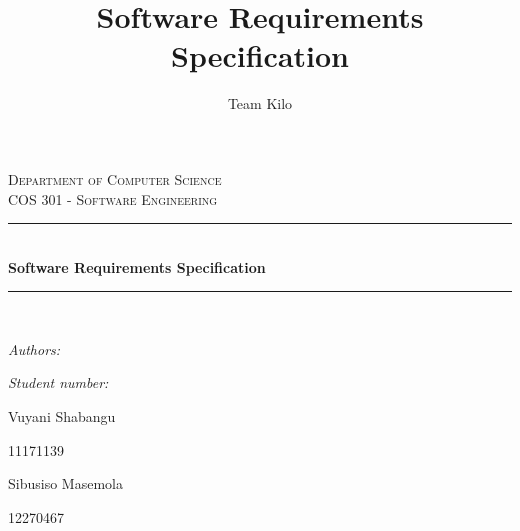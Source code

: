 \documentclass[hidelinks,a4paper,12pt]{article}
\author{Team Kilo}
\title{ Software Requirements Specification}
\newcommand{\HRule}{\rule{\linewidth}{0.5mm}}
\begin{document}
	\setlength{\parskip}{6pt}
	
	\begin{titlepage}
		
		\begin{center}
		
			\textsc{\LARGE Department of Computer Science}\\[1.5cm]
			\textsc{\Large COS 301 - Software Engineering}\\[0.5cm]
			\HRule \\[0.4cm]
			{ \huge \bfseries Software Requirements Specification}\\[0.4cm]
			\HRule \\[0.4cm]
			\begin{minipage}{0.4\textwidth}
				\begin{flushleft} \large
					\emph{Authors:}
				\end{flushleft}
			\end{minipage}
			\begin{minipage}{0.4\textwidth}
				\begin{flushright} \large
					\emph{Student number:}
				\end{flushright}
			\end{minipage}
			
			\begin{minipage}{0.4\textwidth}
				\begin{flushleft} \large
					Vuyani {Shabangu}
				\end{flushleft}
			\end{minipage}
			\begin{minipage}{0.4\textwidth}
				\begin{flushright} \large
					\emph{}
					11171139
				\end{flushright}
			\end{minipage}
			
			\begin{minipage}{0.4\textwidth}
				\begin{flushleft} \large
					Sibusiso {Masemola}
				\end{flushleft}
			\end{minipage}
			\begin{minipage}{0.4\textwidth}
				\begin{flushright} \large
					\emph{}
					12270467
				\end{flushright}
			\end{minipage}
			

\end{center}
\end{titlepage}
\end{document}
